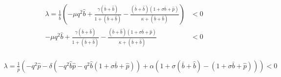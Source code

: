 \documentclass{X:/Documents/Coding/Latex/myassignment}
\begin{document}
\begin{enumerate}
\begin{enumerate}
		\begin{align*}
			\lambda = \frac{1}{\hat{b}} \left( -\mu q^2 \hat b + \frac{\gamma (\bar b + \hat b)}{1+ (\bar b + \hat b)} - \frac{(\bar b + \hat b)(1 + \sigma \bar b + \hat p) }{\kappa + (\bar b + \hat b)}\right) &< 0\\
			 -\mu q^2 \hat b + \frac{\gamma (\bar b + \hat b)}{1+ (\bar b + \hat b)} - \frac{(\bar b + \hat b)(1 + \sigma \bar b + \hat p) }{\kappa + (\bar b + \hat b)} &< 0\\
		\end{align*}

		\begin{align*}
			\lambda = \frac{1}{\hat{p}}\left(-q^2 \hat p - \delta \left(-q^2\hat{b}\hat{p}  - q^2 \hat{b}(1 + \sigma\bar{b} + \hat{p})\right) + \alpha (1 + \sigma (\bar{b} + \hat{b}) -(1 + \sigma \bar{b} +\hat{p}))\right) < 0
		\end{align*}


\end{enumerate}
\end{enumerate}
\end{document}
